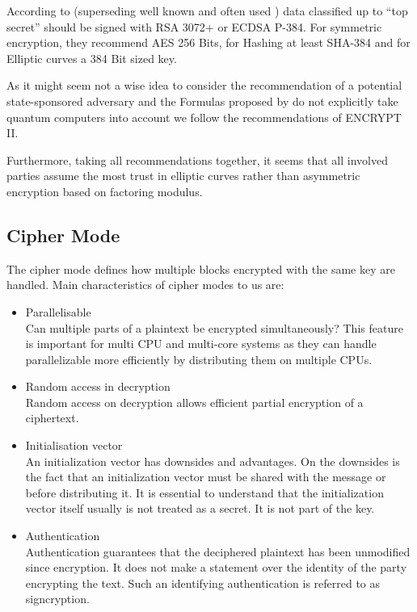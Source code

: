 According to \cite{CNSASuite} (superseding well known and often used \cite{nsa-fact-sheet-B}) data classified up to ``top secret'' should be signed with RSA 3072+ or ECDSA P-384.  For symmetric encryption, they recommend AES 256 Bits, for Hashing at least SHA-384 and for Elliptic curves a 384 Bit sized key.

As it might seem not a wise idea to consider the recommendation of a potential state-sponsored adversary and the Formulas proposed by \citeauthor{Lenstra04keylength.} do not explicitly take quantum computers into account we follow the recommendations of ENCRYPT II.

Furthermore, taking all recommendations together, it seems that all involved parties assume the most trust in elliptic curves rather than asymmetric encryption based on factoring modulus.

\subsection{Cipher Mode}
The cipher mode defines how multiple blocks encrypted with the same key are handled. Main characteristics of cipher modes to us are:
\begin{itemize}
	\item Parallelisable\\ 
	Can multiple parts of a plaintext be encrypted simultaneously? This feature is important for multi CPU and multi-core systems as they can handle parallelizable more efficiently by distributing them on multiple CPUs.
	\item Random access in decryption\\
	Random access on decryption allows efficient partial encryption of a ciphertext.
	\item Initialisation vector\\
	An initialization vector has downsides and advantages. On the downsides is the fact that an initialization vector must be shared with the message or before distributing it. It is essential to understand that the initialization vector itself usually is not treated as a secret. It is not part of the key.
	\item Authentication\\
	Authentication guarantees that the deciphered plaintext has been unmodified since encryption. It does not make a statement over the identity of the party encrypting the text. Such an identifying authentication is referred to as signcryption.
\end{itemize}

